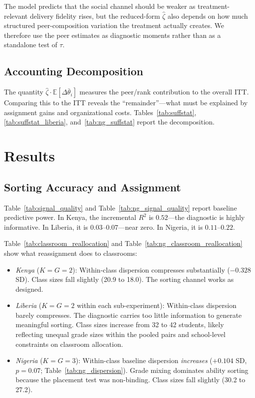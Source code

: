 \documentclass[11pt]{article}
\newcommand{\E}{\mathbb{E}}
\begin{document}
The model predicts that the social channel should be weaker as treatment-relevant delivery fidelity rises, but the reduced-form $\hat{\zeta}$ also depends on how much structured peer-composition variation the treatment actually creates. We therefore use the peer estimates as diagnostic moments rather than as a standalone test of $\tau$.

\subsection{Accounting Decomposition}
\label{sec:accounting}

The quantity $\hat{\zeta} \cdot \E[\Delta\bar{\theta}_i]$ measures the peer/rank contribution to the overall ITT. Comparing this to the ITT reveals the ``remainder''---what must be explained by assignment gains and organizational costs. Tables~\ref{tab:suffstat}, \ref{tab:suffstat_liberia}, and~\ref{tab:ng_suffstat} report the decomposition.


\section{Results}
\label{sec:results}

\subsection{Sorting Accuracy and Assignment}

Table~\ref{tab:signal_quality} and Table~\ref{tab:ng_signal_quality} report baseline predictive power. In Kenya, the incremental $R^2$ is $0.52$---the diagnostic is highly informative. In Liberia, it is $0.03$--$0.07$---near zero. In Nigeria, it is $0.11$--$0.22$.

Table~\ref{tab:classroom_reallocation} and Table~\ref{tab:ng_classroom_reallocation} show what reassignment does to classrooms:

\begin{itemize}
\item \emph{Kenya} ($K = G = 2$): Within-class dispersion compresses substantially ($-0.328$ SD). Class sizes fall slightly (20.9 to 18.0). The sorting channel works as designed.

\item \emph{Liberia} ($K = G = 2$ within each sub-experiment): Within-class dispersion barely compresses. The diagnostic carries too little information to generate meaningful sorting. Class sizes increase from 32 to 42 students, likely reflecting unequal grade sizes within the pooled pairs and school-level constraints on classroom allocation.

\item \emph{Nigeria} ($K = G = 3$): Within-class baseline dispersion \emph{increases} ($+0.104$ SD, $p = 0.07$; Table~\ref{tab:ng_dispersion}). Grade mixing dominates ability sorting because the placement test was non-binding. Class sizes fall slightly (30.2 to 27.2).
\end{itemize}
\end{document}
